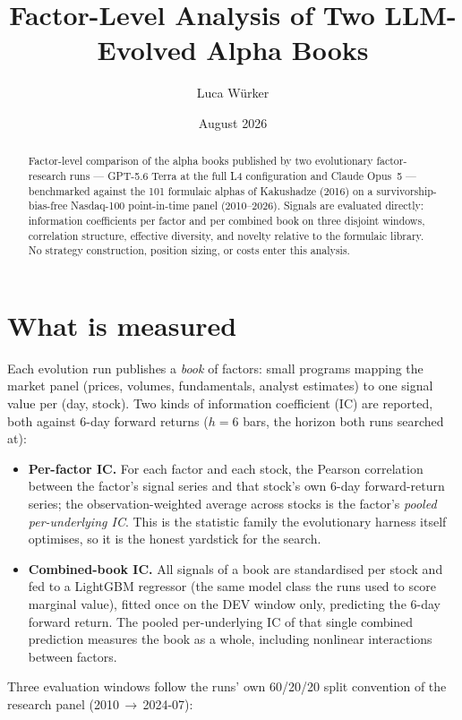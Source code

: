 \documentclass[11pt,a4paper]{article}
\title{\bfseries Factor-Level Analysis of Two LLM-Evolved Alpha Books}
\author{Luca W\"urker}
\date{August 2026}
\begin{document}
\maketitle

\begin{abstract}
\noindent Factor-level comparison of the alpha books published by two evolutionary
factor-research runs --- GPT-5.6 Terra at the full L4 configuration and Claude
Opus~5 --- benchmarked against the 101 formulaic alphas of Kakushadze (2016) on a
survivorship-bias-free Nasdaq-100 point-in-time panel (2010--2026). Signals are
evaluated directly: information coefficients per factor and per combined book on
three disjoint windows, correlation structure, effective diversity, and novelty
relative to the formulaic library. No strategy construction, position sizing, or
costs enter this analysis.
\end{abstract}

\section{What is measured}

Each evolution run publishes a \emph{book} of factors: small programs mapping the
market panel (prices, volumes, fundamentals, analyst estimates) to one signal value
per (day, stock). Two kinds of information coefficient (IC) are reported, both
against 6-day forward returns ($h=6$ bars, the horizon both runs searched at):

\begin{itemize}
\item \textbf{Per-factor IC.} For each factor and each stock, the Pearson
correlation between the factor's signal series and that stock's own 6-day
forward-return series; the observation-weighted average across stocks is the
factor's \emph{pooled per-underlying IC}. This is the statistic family the
evolutionary harness itself optimises, so it is the honest yardstick for the
search.
\item \textbf{Combined-book IC.} All signals of a book are standardised per stock
and fed to a LightGBM regressor (the same model class the runs used to score
marginal value), fitted once on the DEV window only, predicting the 6-day forward
return. The pooled per-underlying IC of that single combined prediction measures
the book as a whole, including nonlinear interactions between factors.
\end{itemize}

Three evaluation windows follow the runs' own 60/20/20 split convention of the
research panel (2010\,$\to$\,2024-07):
\end{document}
